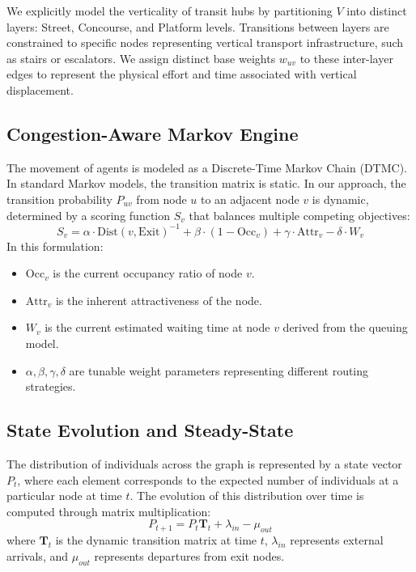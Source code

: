 \documentclass[conference]{IEEEtran}
\begin{document}
We explicitly model the verticality of transit hubs by partitioning $V$ into distinct layers: Street, Concourse, and Platform levels. Transitions between layers are constrained to specific nodes representing vertical transport infrastructure, such as stairs or escalators. We assign distinct base weights $w_{uv}$ to these inter-layer edges to represent the physical effort and time associated with vertical displacement.

\subsection{Congestion-Aware Markov Engine}
The movement of agents is modeled as a Discrete-Time Markov Chain (DTMC). In standard Markov models, the transition matrix is static. In our approach, the transition probability $P_{uv}$ from node $u$ to an adjacent node $v$ is dynamic, determined by a scoring function $S_v$ that balances multiple competing objectives:
\begin{equation}
S_v = \alpha \cdot \text{Dist}(v, \text{Exit})^{-1} + \beta \cdot (1 - \text{Occ}_v) + \gamma \cdot \text{Attr}_v - \delta \cdot W_v
\end{equation}
In this formulation:
\begin{itemize}
    \item $\text{Occ}_v$ is the current occupancy ratio of node $v$.
    \item $\text{Attr}_v$ is the inherent attractiveness of the node.
    \item $W_v$ is the current estimated waiting time at node $v$ derived from the queuing model.
    \item $\alpha, \beta, \gamma, \delta$ are tunable weight parameters representing different routing strategies.
\end{itemize}

\subsection{State Evolution and Steady-State}
The distribution of individuals across the graph is represented by a state vector $P_t$, where each element corresponds to the expected number of individuals at a particular node at time $t$. The evolution of this distribution over time is computed through matrix multiplication:
\begin{equation}
P_{t+1} = P_t \mathbf{T}_t + \lambda_{in} - \mu_{out}
\end{equation}
where $\mathbf{T}_t$ is the dynamic transition matrix at time $t$, $\lambda_{in}$ represents external arrivals, and $\mu_{out}$ represents departures from exit nodes.
\end{document}

